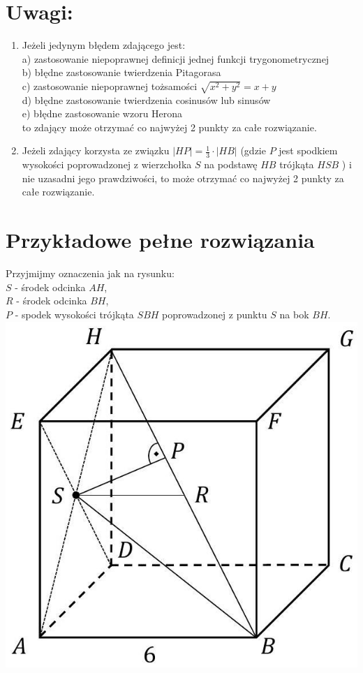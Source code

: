 \documentclass[10pt]{article}
\begin{document}
\section*{Uwagi:}
\begin{enumerate}
  \item Jeżeli jedynym błędem zdającego jest:\\
a) zastosowanie niepoprawnej definicji jednej funkcji trygonometrycznej\\
b) błędne zastosowanie twierdzenia Pitagorasa\\
c) zastosowanie niepoprawnej tożsamości $\sqrt{x^{2}+y^{2}}=x+y$\\
d) błędne zastosowanie twierdzenia cosinusów lub sinusów\\
e) błędne zastosowanie wzoru Herona\\
to zdający może otrzymać co najwyżej 2 punkty za całe rozwiązanie.
  \item Jeżeli zdający korzysta ze związku $|H P|=\frac{1}{3} \cdot|H B|$ (gdzie $P$ jest spodkiem wysokości poprowadzonej z wierzchołka $S$ na podstawę $H B$ trójkąta $H S B$ ) i nie uzasadni jego prawdziwości, to może otrzymać co najwyżej 2 punkty za całe rozwiązanie.
\end{enumerate}

\section*{Przykładowe pełne rozwiązania}
Przyjmijmy oznaczenia jak na rysunku:\\
$S$ - środek odcinka $A H$,\\
$R$ - środek odcinka $B H$,\\
$P$ - spodek wysokości trójkąta $S B H$ poprowadzonej z punktu $S$ na bok $B H$.\\
\includegraphics[max width=\textwidth, center]{2025_02_07_dcb3d059df06a3930b0ag-33}
\end{document}
